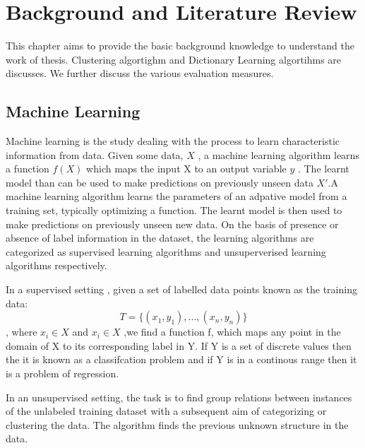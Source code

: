 
\chapter{Background and Literature Review}

\ifpdf
    \graphicspath{{Chapter2/Figs/Raster/}{Chapter2/Figs/PDF/}{Chapter2/Figs/}}
\else
    \graphicspath{{Chapter2/Figs/Vector/}{Chapter2/Figs/}}
\fi

This chapter aims to provide the basic background knowledge to understand the work of thesis. Clustering algortighm and Dictionary Learning algortihms are discusses. We further discuss the various evaluation measures.
\section[Machine Learning]{Machine Learning}

Machine learning is the study dealing with the process to learn characteristic information from data. Given some data, $ X $ , a machine learning algorithm learns a function $ f(X) $ which maps the input X to an output variable $y$ . The learnt model than can be used to make predictions on previously unseen data $X'$.A machine learning algorithm learns the parameters of an adpative model from a training set, typically optimizing a function. The learnt model is then used to make predictions on previously unseen new data. On the basis of presence or absence of label information in the dataset, the learning algorithms are categorized as supervised learning algorithms and unsuperverised learning algorithms respectively.

In a supervised setting , given a set of labelled  data points known as the training data: $$ T = \{(x_1,y_1),...,(x_n,y_n)\} $$, where $x_i \in X$ and $x_i \in X$ ,we find a function f, which maps any point in the domain of X to its corresponding label in Y. If Y is a set of discrete values then the it is known as a classifcation problem and if Y is in a continous range then it is a problem of regression.

In an unsupervised setting, the task is to find group relations between instances of the unlabeled training dataset with a subsequent aim of categorizing or clustering the data. The algorithm finds the previous unknown structure in the data.

